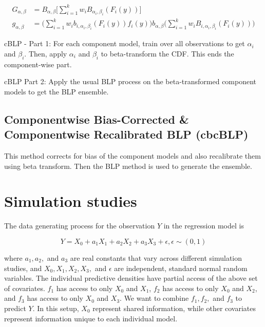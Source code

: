 \documentclass[]{article}
\begin{document}
\[
\begin{aligned}
G_{\alpha,\beta} &= B_{\alpha,\beta}\Big[\sum_{i=1}^k w_iB_{\alpha_i,\beta_i}(F_i(y))\Big]\\
g_{\alpha,\beta} &= \Big(\sum_{i=1}^k w_ib_{i,\alpha_i,\beta_i}(F_i(y))f_i(y)  \Big)b_{\alpha,\beta} \Big(\sum_{i=1}^k w_iB_{i,\alpha_i,\beta_i}(F_i(y))\Big)
\end{aligned}
\]

cBLP - Part 1: For each component model, train over all observations to
get \(\alpha_i\) and \(\beta_i\). Then, apply \(\alpha_i\) and
\(\beta_i\) to beta-transform the CDF. This ends the component-wise
part.

cBLP Part 2: Apply the usual BLP process on the beta-transformed
component models to get the BLP ensemble.

\hypertarget{componentwise-bias-corrected-componentwise-recalibrated-blp-cbcblp}{%
\subsection{Componentwise Bias-Corrected \& Componentwise Recalibrated
BLP
(cbcBLP)}\label{componentwise-bias-corrected-componentwise-recalibrated-blp-cbcblp}}

This method corrects for bias of the component models and also
recalibrate them using beta transform. Then the BLP method is used to
generate the ensemble.

\clearpage

\hypertarget{simulation-studies}{%
\section{Simulation studies}\label{simulation-studies}}

The data generating process for the observation \(Y\) in the regression
model is

\[
Y=X_0+a_1X_1+a_2X_2+a_3X_3+\epsilon, \epsilon\sim(0,1)
\]

where \(a_1,a_2,\) and \(a_3\) are real constants that vary across
different simulation studies, and \(X_0,X_1,X_2,X_3,\) and \(\epsilon\)
are independent, standard normal random variables. The individual
predictive densities have partial access of the above set of covariates.
\(f_1\) has access to only \(X_0\) and \(X_1\), \(f_2\) has access to
only \(X_0\) and \(X_2\), and \(f_3\) has access to only \(X_0\) and
\(X_3\). We want to combine \(f_1,f_2,\) and \(f_3\) to predict \(Y\).
In this setup, \(X_0\) represent shared information, while other
covariates represent information unique to each individual model.
\end{document}
